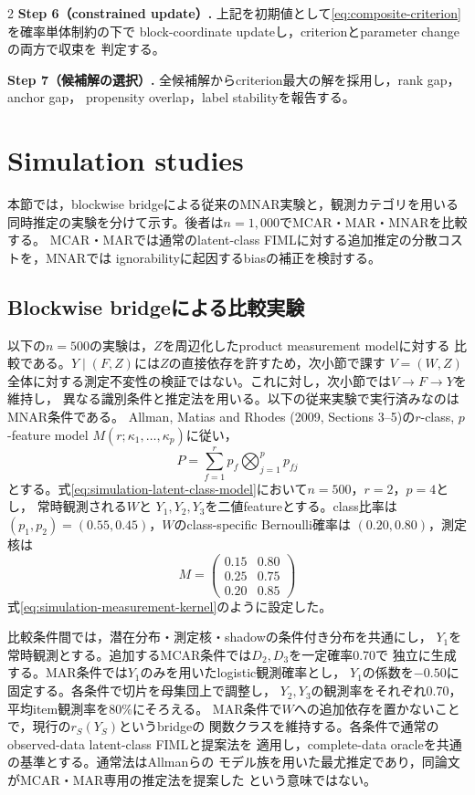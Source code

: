 \documentclass[a4paper,10pt]{article}
\begin{document}
\begin{multicols}{2}
\noindent\textbf{Step 6（constrained update）.}
上記を初期値として\eqref{eq:composite-criterion}を確率単体制約の下で
block-coordinate updateし，criterionとparameter changeの両方で収束を
判定する。

\noindent\textbf{Step 7（候補解の選択）.}
全候補解からcriterion最大の解を採用し，rank gap，anchor gap，
propensity overlap，label stabilityを報告する。

\section{Simulation studies}
本節では，blockwise bridgeによる従来のMNAR実験と，観測カテゴリを用いる
同時推定の実験を分けて示す。後者は$n=1{,}000$でMCAR・MAR・MNARを比較する。
MCAR・MARでは通常のlatent-class FIMLに対する追加推定の分散コストを，MNARでは
ignorabilityに起因するbiasの補正を検討する。

\subsection{Blockwise bridgeによる比較実験}
以下の$n=500$の実験は，$Z$を周辺化したproduct measurement modelに対する
比較である。$Y\mid(F,Z)$には$Z$の直接依存を許すため，次小節で課す
$V=(W,Z)$全体に対する測定不変性の検証ではない。これに対し，次小節では$V\to F\to Y$を維持し，
異なる識別条件と推定法を用いる。以下の従来実験で実行済みなのはMNAR条件である。
Allman, Matias and Rhodes
(2009, Sections 3--5)の$r$-class, $p$-feature model
$M(r;\kappa_1,\ldots,\kappa_p)$に従い，
\begin{equation}
P=\sum_{f=1}^r p_f\bigotimes_{j=1}^p p_{fj}
\label{eq:simulation-latent-class-model}
\end{equation}
とする。式\eqref{eq:simulation-latent-class-model}において$n=500$，$r=2$，$p=4$とし，
常時観測される$W$と
$Y_1,Y_2,Y_3$を二値featureとする。class比率は
$(p_1,p_2)=(0.55,0.45)$，$W$のclass-specific Bernoulli確率は
$(0.20,0.80)$，測定核は
\begin{equation}
M=\begin{pmatrix}
0.15&0.80\\
0.25&0.75\\
0.20&0.85
\end{pmatrix}
\label{eq:simulation-measurement-kernel}
\end{equation}
式\eqref{eq:simulation-measurement-kernel}のように設定した。

比較条件間では，潜在分布・測定核・shadowの条件付き分布を共通にし，
$Y_1$を常時観測とする。追加するMCAR条件では$D_2,D_3$を一定確率0.70で
独立に生成する。MAR条件では$Y_1$のみを用いたlogistic観測確率とし，
$Y_1$の係数を$-0.50$に固定する。各条件で切片を母集団上で調整し，
$Y_2,Y_3$の観測率をそれぞれ0.70，平均item観測率を80\%にそろえる。
MAR条件で$W$への追加依存を置かないことで，現行の$r_S(Y_S)$というbridgeの
関数クラスを維持する。各条件で通常のobserved-data latent-class FIMLと提案法を
適用し，complete-data oracleを共通の基準とする。通常法はAllmanらの
モデル族を用いた最尤推定であり，同論文がMCAR・MAR専用の推定法を提案した
という意味ではない。


\end{multicols}
\end{document}
